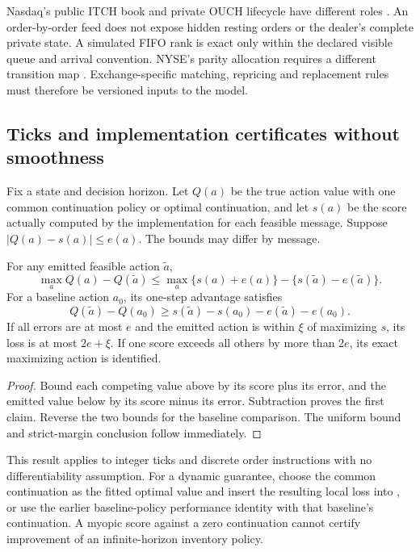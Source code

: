 Nasdaq's public ITCH book and private OUCH lifecycle have different roles
\citep{DeployITCH,DeployOUCH}. An order-by-order feed does not expose hidden
resting orders or the dealer's complete private state. A simulated FIFO
rank is exact only within the declared visible queue and arrival convention.
NYSE's parity allocation requires a different transition map
\citep{DeployNYSE}. Exchange-specific matching, repricing and replacement
rules must therefore be versioned inputs to the model.

\subsection{Ticks and implementation certificates without smoothness}

Fix a state and decision horizon. Let $Q(a)$ be the true action value with
one common continuation policy or optimal continuation, and let $s(a)$ be
the score actually computed by the implementation for each feasible message.
Suppose $|Q(a)-s(a)|\le e(a)$. The bounds may differ by message.

\begin{lemma}
\label{prop:compiledmessage}
For any emitted feasible action $\widetilde a$,
\begin{equation}\label{eq:compiledgap}
 \max_a Q(a)-Q(\widetilde a)
 \le \max_a\{s(a)+e(a)\}-\{s(\widetilde a)-e(\widetilde a)\}.
\end{equation}
For a baseline action $a_0$, its one-step advantage satisfies
\begin{equation}\label{eq:compiledadvantage}
 Q(\widetilde a)-Q(a_0)
 \ge s(\widetilde a)-s(a_0)-e(\widetilde a)-e(a_0).
\end{equation}
If all errors are at most $e$ and the emitted action is within $\xi$ of
maximizing $s$, its loss is at most $2e+\xi$. If one score exceeds all others
by more than $2e$, its exact maximizing action is identified.
\end{lemma}
\begin{proof}
Bound each competing value above by its score plus its error, and the emitted
value below by its score minus its error. Subtraction proves the first claim.
Reverse the two bounds for the baseline comparison. The uniform bound and
strict-margin conclusion follow immediately.
\end{proof}

This result applies to integer ticks and discrete order instructions with
no differentiability assumption. For a dynamic guarantee, choose the common
continuation as the fitted optimal value and insert the resulting local
loss into \citet[Theorem~39.1]{NoguerAlonso2026Execution}, or use the earlier
baseline-policy performance identity with that baseline's continuation.
A myopic score against a zero continuation cannot certify improvement of
an infinite-horizon inventory policy.

